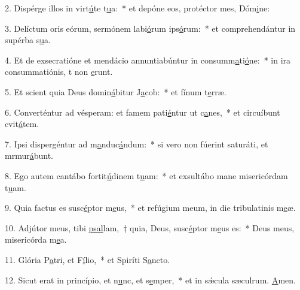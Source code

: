 2. Dispérge illos in virt\uline{ú}te t\uline{u}a:~* et depóne eos, protéctor mes, Dóm\uline{i}ne:\par 
3. Delíctum oris eórum, sermónem labi\uline{ó}rum ips\uline{ó}rum:~* et comprehendántur in supérba s\uline{u}a.\par 
4. Et de exsecratióne et mendácio annuntiabúntur in consumm\uline{a}ti\uline{ó}ne:~* in ira consummatiónis, t non \uline{e}runt.\par 
5. Et scient quia Deus domin\uline{á}bitur J\uline{a}cob:~* et fínum t\uline{e}rræ.\par 
6. Converténtur ad vésperam: et famem pati\uline{é}ntur ut c\uline{a}nes,~* et circuíbunt cvit\uline{á}tem.\par 
7. Ipsi dispergéntur ad m\uline{a}nduc\uline{á}ndum:~* si vero non fúerint saturáti, et mrmur\uline{á}bunt.\par 
8. Ego autem cantábo fortit\uline{ú}dinem t\uline{u}am:~* et exsultábo mane misericórdam t\uline{u}am.\par 
9. Quia factus es susc\uline{é}ptor m\uline{e}us,~* et refúgium meum, in die tribulatinis m\uline{e}æ.\par 
10. Adjútor meus, tibi \uline{psal}lam,~† quia, Deus, susc\uline{é}ptor m\uline{e}us es:~* Deus meus, misericórda m\uline{e}a.\par 
11. Glória P\uline{a}tri, et F\uline{í}lio,~* et Spiríti S\uline{a}ncto.\par 
12. Sicut erat in princípio, et n\uline{u}nc, et s\uline{e}mper,~* et in sǽcula sæculrum. \uline{A}men.\par 
